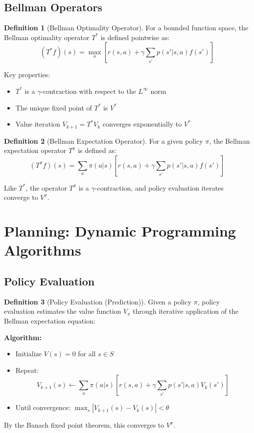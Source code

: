 \documentclass[12pt,a4paper]{article}
\theoremstyle{definition}
\newtheorem{definition}{Definition}[section]
\begin{document}
\subsection{Bellman Operators}

\begin{definition}[Bellman Optimality Operator]
For a bounded function space, the Bellman optimality operator $T^*$ is defined pointwise as:
\[
(T^* f)(s) = \max_a \left[ r(s, a) + \gamma \sum_{s'} p(s' | s, a) f(s') \right]
\]

Key properties:
\begin{itemize}
    \item $T^*$ is a $\gamma$-contraction with respect to the $L^\infty$ norm
    \item The unique fixed point of $T^*$ is $V^*$
    \item Value iteration $V_{k+1} = T^* V_k$ converges exponentially to $V^*$
\end{itemize}
\end{definition}

\begin{definition}[Bellman Expectation Operator]
For a given policy $\pi$, the Bellman expectation operator $T^\pi$ is defined as:
\[
(T^\pi f)(s) = \sum_a \pi(a | s) \left[ r(s, a) + \gamma \sum_{s'} p(s' | s, a) f(s') \right]
\]

Like $T^*$, the operator $T^\pi$ is a $\gamma$-contraction, and policy evaluation iterates converge to $V^\pi$.
\end{definition}

\section{Planning: Dynamic Programming Algorithms}

\subsection{Policy Evaluation}

\begin{definition}[Policy Evaluation (Prediction)]
Given a policy $\pi$, policy evaluation estimates the value function $V_\pi$ through iterative application of the Bellman expectation equation:

\textbf{Algorithm:}
\begin{itemize}
    \item Initialize $V(s) = 0$ for all $s \in S$
    \item Repeat:
    \[
    V_{k+1}(s) \leftarrow \sum_a \pi(a | s) \left[ r(s, a) + \gamma \sum_{s'} p(s' | s, a) V_k(s') \right]
    \]
    \item Until convergence: $\max_s |V_{k+1}(s) - V_k(s)| < \theta$
\end{itemize}

By the Banach fixed point theorem, this converges to $V^\pi$.
\end{definition}
\end{document}
